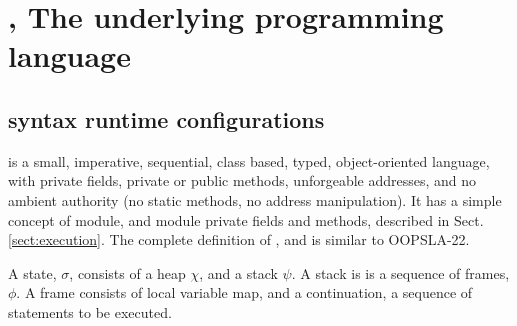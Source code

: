 \section{\LangOO, The underlying programming language } %

\subsection{\LangOO syntax runtime configurations}
\label{sub:Loo} 
 \LangOO  is a {small}, imperative, sequential,  class based, typed, object-oriented language, %
 with private fields, private or public methods, unforgeable addresses, and no ambient authority (no static methods, no address manipulation).
 It has a simple concept of module, and module private fields and methods, described in Sect. \ref{sect:execution}.
The complete definition of , and is  similar to   OOPSLA-22.

A \LangOO state, $\sigma$,  consists of a  heap $\chi$, and a   stack $\psi$. A stack is is a sequence of frames, $\phi$.
A frame consists of local variable map, and a continuation, \ie a sequence of statements to be executed.

 
